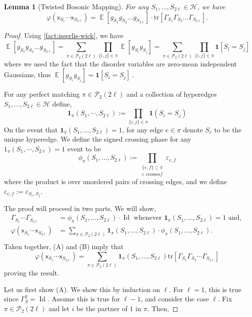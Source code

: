 \documentclass
[11pt,letterpaper]
{article}
\newtheorem{lemma}[theorem]{Lemma}
\theoremstyle{definition}
\newcommand{\sfx}{\mathsf x}
\newcommand{\eps}{\varepsilon}
\newcommand{\1}{\mathbf{1}}
\newcommand{\tr}{\mathrm{tr}}
\newcommand{\cH}{\mathcal H}
\newcommand{\Id}{\operatorname{Id}}
\DeclareMathOperator*{\E}{\mathbb{E}}
\newcommand{\cP}{\mathcal{P}}
\begin{document}
\begin{lemma}[Twisted Bosonic Mapping]\label{lem:twisted-boson-mapping}
For any $S_1, \dots, S_{2\ell} \in \cH$, we have
    \[
    \varphi(\sfx_{S_1}\cdots \sfx_{S_{2\ell}}) = \E[g_{S_1}g_{S_2}\dots g_{S_{2\ell}}]\cdot \tr[\Gamma_{S_1}\Gamma_{S_2}\dots \Gamma_{S_{2\ell}}]. 
    \]
\end{lemma}
\begin{proof}
    Using \cref{fact:isserlis-wick}, we have 
    \[\E[g_{S_1}g_{S_2}\dots g_{S_{2\ell}}] = \sum_{\pi\in \cP_2(2\ell)}\prod_{\{i,j\} \in \pi} \E[g_{S_i}g_{S_j}] = \sum_{\pi\in \cP_2(2\ell)}\prod_{\{i,j\} \in \pi} \1[S_i = S_j]\]
    where we used the fact that the disorder variables are zero-mean independent Gaussians, thus $\E[g_{S_i}g_{S_j}] =\1[S_i = S_j]\ $. 

    
    For any perfect matching $\pi\in\cP_2(2\ell)$ and a collection of hyperedges $S_1,\dots,S_{2\ell}\in\cH$ define,
     \[
     \1_\pi(S_1,\cdots, S_{2\ell}):=\prod_{\{i, j\}\in\pi}\1(S_i = S_j)
     \]
     On the event that $\1_\pi(S_1,\ldots, S_{2\ell}) = 1$, for any edge $e\in\pi$ denote $S_e$ to be the unique hyperedge. We define the signed crossing phase for any $1_\pi(S_1,\cdots, S_{2\ell}) = 1$ event to be
     \[
     \phi_\pi(S_1,\ldots, S_{2\ell}) := \prod_{\substack{\{e,f\}\subset \pi \\ e \text{ crosses} f}} \eps_{e,f}
     \]
     where the product is over unordered pairs of crossing edges, and we define $\eps_{e,f} := \eps_{S_e,S_f}$.  


    The proof will proceed in two parts. We will show, 
    \begin{align*}
 \Gamma_{S_1}\cdots\Gamma_{S_{2\ell}} &= \phi_\pi(S_1,\ldots, S_{2\ell})  \cdot \Id \text{ whenever } \1_\pi(S_1,\ldots, S_{2\ell})=1 \text{ and, } \tag{A} \\ 
        \varphi(\sfx_{S_1}\cdots \sfx_{S_{2\ell}}) &= \sum_{\pi\in\cP_2(2\ell)}\1_\pi(S_1,\ldots, S_{2\ell})\cdot \phi_\pi(S_1,\ldots, S_{2\ell}). \tag{B}\\ 
    \end{align*}
      Taken together, (A) and (B) imply that
    \[
    \varphi(\sfx_{S_1}\cdots \sfx_{S_{2\ell}}) = \sum_{\pi \in \cP_2(2\ell)}\1_\pi(S_1,\ldots, S_{2\ell})\tr[\Gamma_{S_1}\Gamma_{S_2}\cdots \Gamma_{S_{2\ell}}]
    \]
    proving the result.


    
    
     Let us first show (A). We show this by induction on $\ell$. For $\ell=1$, this is true since $\Gamma_S^2=\Id$. Assume this is true for $\ell-1$, and consider the case $\ell$. Fix $\pi\in \cP_2(2\ell)$ and let $i$ be the partner of $1$ in $\pi$. Then,
   

\end{proof}
\end{document}
